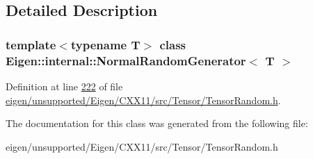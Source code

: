 \subsection{Detailed Description}
\subsubsection*{template$<$typename T$>$\newline
class Eigen\+::internal\+::\+Normal\+Random\+Generator$<$ T $>$}



Definition at line \hyperlink{eigen_2unsupported_2_eigen_2_c_x_x11_2src_2_tensor_2_tensor_random_8h_source_l00222}{222} of file \hyperlink{eigen_2unsupported_2_eigen_2_c_x_x11_2src_2_tensor_2_tensor_random_8h_source}{eigen/unsupported/\+Eigen/\+C\+X\+X11/src/\+Tensor/\+Tensor\+Random.\+h}.



The documentation for this class was generated from the following file\+:\begin{DoxyCompactItemize}
\item 
eigen/unsupported/\+Eigen/\+C\+X\+X11/src/\+Tensor/\+Tensor\+Random.\+h\end{DoxyCompactItemize}
